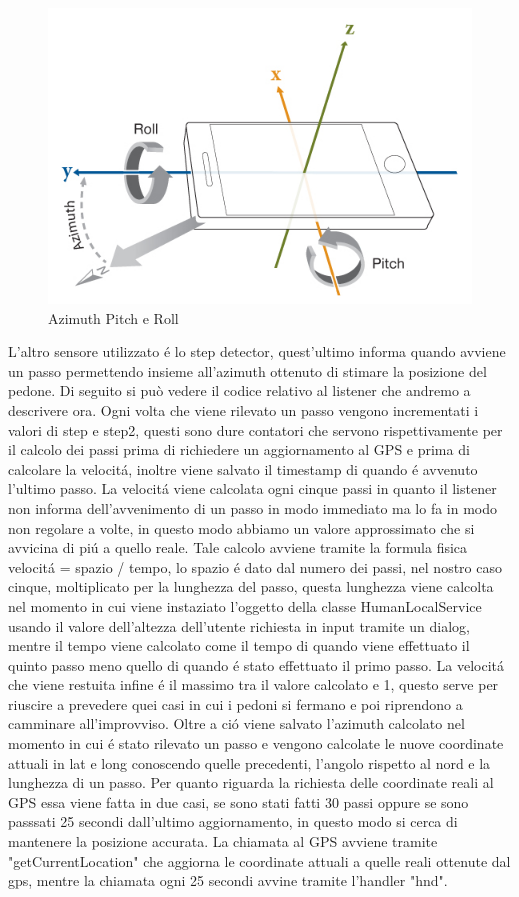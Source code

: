 \documentclass[conference]{IEEEtran}
\begin{document}
\begin{figure}[ht!]
	\centering
	\includegraphics[width=1\linewidth]{az.jpg}
	\caption{Azimuth Pitch e Roll}
	\label{fig:az}
\end{figure}
L'altro sensore utilizzato \'e lo step detector, quest'ultimo informa quando avviene un passo permettendo insieme all'azimuth ottenuto di stimare la posizione del pedone. Di seguito si può vedere il codice relativo al listener che andremo a descrivere ora. Ogni volta che viene rilevato un passo vengono incrementati i valori di step e step2, questi sono dure contatori che servono rispettivamente per il calcolo dei passi prima di richiedere un aggiornamento al GPS e prima di calcolare la velocit\'a, inoltre viene salvato il timestamp di quando \'e avvenuto l'ultimo passo. La velocit\'a viene calcolata ogni cinque passi in quanto il listener non informa dell'avvenimento di un passo in modo immediato ma lo fa in modo non regolare a volte, in questo modo abbiamo un valore approssimato che si avvicina di pi\'u a quello reale. Tale calcolo avviene tramite la formula fisica velocit\'a = spazio / tempo, lo spazio \'e dato dal numero dei passi, nel nostro caso cinque, moltiplicato per la lunghezza del passo, questa lunghezza viene calcolta nel momento in cui viene instaziato l'oggetto della classe HumanLocalService usando il valore dell'altezza dell'utente richiesta in input tramite un dialog, mentre il tempo viene calcolato come il tempo di quando viene effettuato il quinto passo meno quello di quando \'e stato effettuato il primo passo. La velocit\'a che viene restuita infine \'e il massimo tra il valore calcolato e 1, questo serve per riuscire a prevedere quei casi in cui i pedoni si fermano e poi riprendono a camminare all'improvviso. Oltre a ci\'o viene salvato l'azimuth calcolato nel momento in cui \'e stato rilevato un passo e vengono calcolate le nuove coordinate attuali in lat e long conoscendo quelle precedenti, l'angolo rispetto al nord e la lunghezza di un passo. Per quanto riguarda la richiesta delle coordinate reali al GPS essa viene fatta in due casi, se sono stati fatti 30 passi oppure se sono passsati 25 secondi dall'ultimo aggiornamento, in questo modo si cerca di mantenere la posizione accurata. La chiamata al GPS avviene tramite "getCurrentLocation" che aggiorna le coordinate attuali a quelle reali ottenute dal gps, mentre la chiamata ogni 25 secondi avvine tramite l'handler "hnd".  
\end{document}

